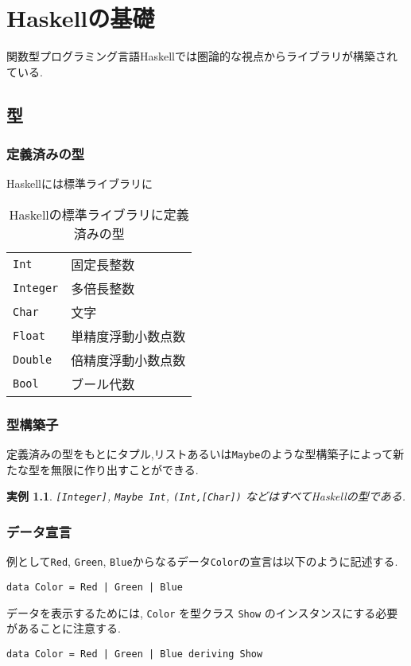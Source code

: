 \documentclass[dvipdfmx]{jsbook}
\theoremstyle{plain}
\newtheorem{example}[thm]{実例}
\begin{document}
\chapter{Haskellの基礎}
関数型プログラミング言語Haskellでは圏論的な視点からライブラリが構築されている.
\section{型}
\subsection{定義済みの型}
Haskellには標準ライブラリに
\begin{table}[h]
\caption{Haskellの標準ライブラリに定義済みの型}
\begin{center}
\begin{tabular}{ll}
\verb|Int|&固定長整数\\
\verb|Integer|&多倍長整数 \\
\verb|Char|&文字\\
\verb|Float|&単精度浮動小数点数\\
\verb|Double|&倍精度浮動小数点数\\
\verb|Bool|&ブール代数\\
\end{tabular}
\end{center}
\end{table}
\subsection{型構築子}
定義済みの型をもとにタプル,リストあるいは\verb|Maybe|のような型構築子によって新たな型を無限に作り出すことができる.
\begin{example}
\verb|[Integer]|, \verb|Maybe Int|,
\verb|(Int,[Char])| などはすべてHaskellの型である.
\end{example}
\subsection{データ宣言}
例として\verb|Red|, \verb|Green|, \verb|Blue|からなるデータ\verb|Color|の宣言は以下のように記述する.
\begin{lstlisting}
data Color = Red | Green | Blue 
\end{lstlisting}
データを表示するためには, \verb|Color| を型クラス \verb|Show| のインスタンスにする必要があることに注意する.
\begin{lstlisting}
data Color = Red | Green | Blue deriving Show
\end{lstlisting}
\end{document}
